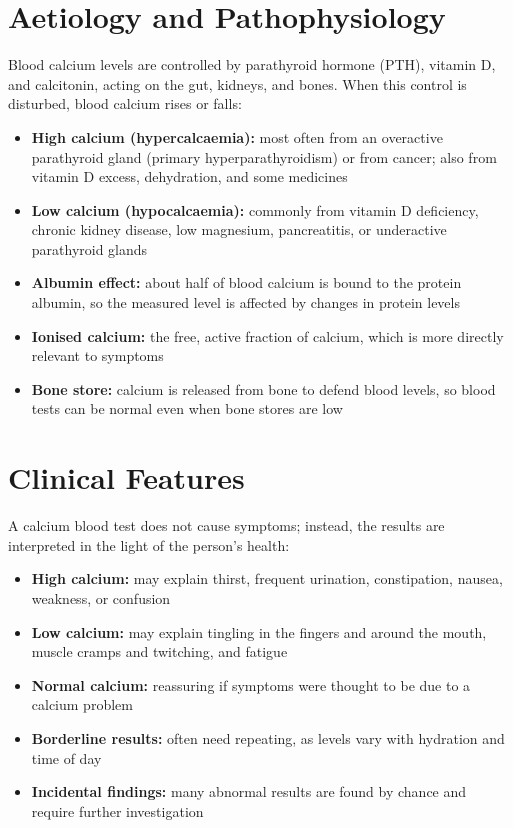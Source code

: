 \section*{Aetiology and Pathophysiology}
Blood calcium levels are controlled by parathyroid hormone (PTH), vitamin D, and calcitonin, acting on the gut, kidneys, and bones. When this control is disturbed, blood calcium rises or falls:
\begin{itemize}
    \item \textbf{High calcium (hypercalcaemia):} most often from an overactive parathyroid gland (primary hyperparathyroidism) or from cancer; also from vitamin D excess, dehydration, and some medicines
    \item \textbf{Low calcium (hypocalcaemia):} commonly from vitamin D deficiency, chronic kidney disease, low magnesium, pancreatitis, or underactive parathyroid glands
    \item \textbf{Albumin effect:} about half of blood calcium is bound to the protein albumin, so the measured level is affected by changes in protein levels
    \item \textbf{Ionised calcium:} the free, active fraction of calcium, which is more directly relevant to symptoms
    \item \textbf{Bone store:} calcium is released from bone to defend blood levels, so blood tests can be normal even when bone stores are low
\end{itemize}

\section*{Clinical Features}
A calcium blood test does not cause symptoms; instead, the results are interpreted in the light of the person's health:
\begin{itemize}
    \item \textbf{High calcium:} may explain thirst, frequent urination, constipation, nausea, weakness, or confusion
    \item \textbf{Low calcium:} may explain tingling in the fingers and around the mouth, muscle cramps and twitching, and fatigue
    \item \textbf{Normal calcium:} reassuring if symptoms were thought to be due to a calcium problem
    \item \textbf{Borderline results:} often need repeating, as levels vary with hydration and time of day
    \item \textbf{Incidental findings:} many abnormal results are found by chance and require further investigation
\end{itemize}

